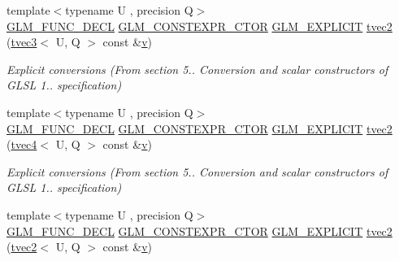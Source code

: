 \begin{DoxyCompactItemize}
\item 
{\footnotesize template$<$typename U , precision Q$>$ }\\\mbox{\hyperlink{setup_8hpp_ab2d052de21a70539923e9bcbf6e83a51}{G\+L\+M\+\_\+\+F\+U\+N\+C\+\_\+\+D\+E\+CL}} \mbox{\hyperlink{setup_8hpp_ad34178a09666081abdb573c14d1f4a5a}{G\+L\+M\+\_\+\+C\+O\+N\+S\+T\+E\+X\+P\+R\+\_\+\+C\+T\+OR}} \mbox{\hyperlink{setup_8hpp_a6c74f5a5e7b134ab69023ff9a30d4d5d}{G\+L\+M\+\_\+\+E\+X\+P\+L\+I\+C\+IT}} \mbox{\hyperlink{structglm_1_1tvec2_a230aa7113a4beee76efb778695d009dc}{tvec2}} (\mbox{\hyperlink{structglm_1_1tvec3}{tvec3}}$<$ U, Q $>$ const \&\mbox{\hyperlink{glad_8h_a14cfbe2fc2234f5504618905b69d1e06}{v}})
\begin{DoxyCompactList}\small\item\em Explicit conversions (From section 5.. Conversion and scalar constructors of G\+L\+SL 1.. specification) \end{DoxyCompactList}\item 
{\footnotesize template$<$typename U , precision Q$>$ }\\\mbox{\hyperlink{setup_8hpp_ab2d052de21a70539923e9bcbf6e83a51}{G\+L\+M\+\_\+\+F\+U\+N\+C\+\_\+\+D\+E\+CL}} \mbox{\hyperlink{setup_8hpp_ad34178a09666081abdb573c14d1f4a5a}{G\+L\+M\+\_\+\+C\+O\+N\+S\+T\+E\+X\+P\+R\+\_\+\+C\+T\+OR}} \mbox{\hyperlink{setup_8hpp_a6c74f5a5e7b134ab69023ff9a30d4d5d}{G\+L\+M\+\_\+\+E\+X\+P\+L\+I\+C\+IT}} \mbox{\hyperlink{structglm_1_1tvec2_a14d29e21c541c5efe511679d2d7c788a}{tvec2}} (\mbox{\hyperlink{structglm_1_1tvec4}{tvec4}}$<$ U, Q $>$ const \&\mbox{\hyperlink{glad_8h_a14cfbe2fc2234f5504618905b69d1e06}{v}})
\begin{DoxyCompactList}\small\item\em Explicit conversions (From section 5.. Conversion and scalar constructors of G\+L\+SL 1.. specification) \end{DoxyCompactList}\item 
{\footnotesize template$<$typename U , precision Q$>$ }\\\mbox{\hyperlink{setup_8hpp_ab2d052de21a70539923e9bcbf6e83a51}{G\+L\+M\+\_\+\+F\+U\+N\+C\+\_\+\+D\+E\+CL}} \mbox{\hyperlink{setup_8hpp_ad34178a09666081abdb573c14d1f4a5a}{G\+L\+M\+\_\+\+C\+O\+N\+S\+T\+E\+X\+P\+R\+\_\+\+C\+T\+OR}} \mbox{\hyperlink{setup_8hpp_a6c74f5a5e7b134ab69023ff9a30d4d5d}{G\+L\+M\+\_\+\+E\+X\+P\+L\+I\+C\+IT}} \mbox{\hyperlink{structglm_1_1tvec2_a831bbad1e14099b7b8fe77b5efeb7c47}{tvec2}} (\mbox{\hyperlink{structglm_1_1tvec2}{tvec2}}$<$ U, Q $>$ const \&\mbox{\hyperlink{glad_8h_a14cfbe2fc2234f5504618905b69d1e06}{v}})

\end{DoxyCompactItemize}

